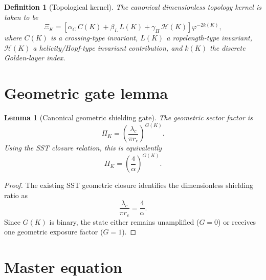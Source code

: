 \documentclass[11pt,a4paper]{article}
\providecommand{\rc}{r_c}
\newtheorem{definition}{Definition}
\newtheorem{lemma}{Lemma}
\begin{document}
            \begin{definition}[Topological kernel]
                The canonical dimensionless topology kernel is taken to be
                \begin{equation}
                    \Xi_K=
                    \left[\alpha_C\,C(K)+\beta_L\,L(K)+\gamma_H\,\mathcal H(K)\right]\varphi^{-2k(K)},
                \end{equation}
                where \(C(K)\) is a crossing-type invariant, \(L(K)\) a ropelength-type invariant,
                \(\mathcal H(K)\) a helicity/Hopf-type invariant contribution, and \(k(K)\) the discrete Golden-layer index.
            \end{definition}
        
        \section{Geometric gate lemma}
            
            \begin{lemma}[Canonical geometric shielding gate]
                The geometric sector factor is
                \begin{equation}
                    \Pi_K=\left(\frac{\lambda_c}{\pi \rc}\right)^{G(K)}.
                \end{equation}
                Using the SST closure relation, this is equivalently
                \begin{equation}
                    \Pi_K=\left(\frac{4}{\alpha}\right)^{G(K)}.
                \end{equation}
            \end{lemma}
            
            \begin{proof}
                The existing SST geometric closure identifies the dimensionless shielding ratio as
                \begin{equation}
                    \frac{\lambda_c}{\pi \rc}=\frac{4}{\alpha}.
                \end{equation}
                Since \(G(K)\) is binary, the state either remains unamplified (\(G=0\)) or receives one geometric exposure factor (\(G=1\)).
            \end{proof}
        
        \section{Master equation}
            
\end{document}
